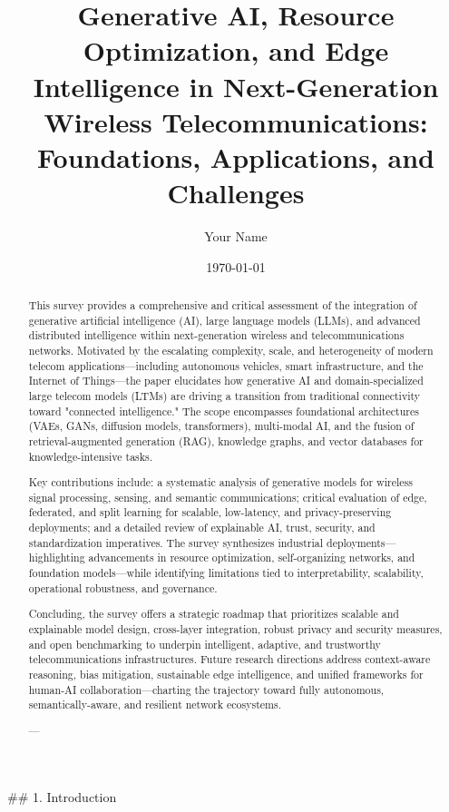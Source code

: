 \documentclass[11pt]{article}
\begin{document}
\author{Your Name}
\date{\today}

\title{\title{Generative AI, Resource Optimization, and Edge Intelligence in Next-Generation Wireless Telecommunications: Foundations, Applications, and Challenges}}
\maketitle

\begin{abstract}
This survey provides a comprehensive and critical assessment of the integration of generative artificial intelligence (AI), large language models (LLMs), and advanced distributed intelligence within next-generation wireless and telecommunications networks. Motivated by the escalating complexity, scale, and heterogeneity of modern telecom applications—including autonomous vehicles, smart infrastructure, and the Internet of Things—the paper elucidates how generative AI and domain-specialized large telecom models (LTMs) are driving a transition from traditional connectivity toward "connected intelligence." The scope encompasses foundational architectures (VAEs, GANs, diffusion models, transformers), multi-modal AI, and the fusion of retrieval-augmented generation (RAG), knowledge graphs, and vector databases for knowledge-intensive tasks.

Key contributions include: a systematic analysis of generative models for wireless signal processing, sensing, and semantic communications; critical evaluation of edge, federated, and split learning for scalable, low-latency, and privacy-preserving deployments; and a detailed review of explainable AI, trust, security, and standardization imperatives. The survey synthesizes industrial deployments—highlighting advancements in resource optimization, self-organizing networks, and foundation models—while identifying limitations tied to interpretability, scalability, operational robustness, and governance.

Concluding, the survey offers a strategic roadmap that prioritizes scalable and explainable model design, cross-layer integration, robust privacy and security measures, and open benchmarking to underpin intelligent, adaptive, and trustworthy telecommunications infrastructures. Future research directions address context-aware reasoning, bias mitigation, sustainable edge intelligence, and unified frameworks for human-AI collaboration—charting the trajectory toward fully autonomous, semantically-aware, and resilient network ecosystems.

---
\end{abstract}## 1. Introduction
\end{document}

